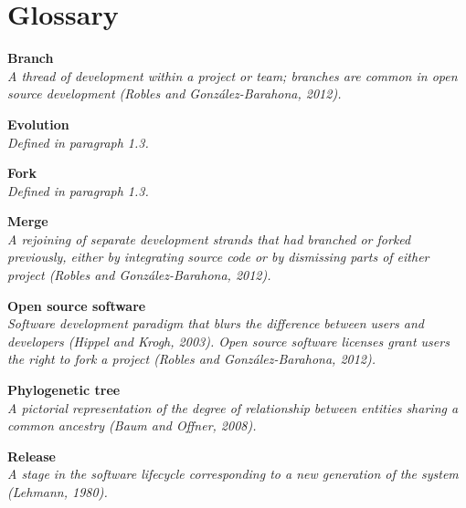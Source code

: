 \chapter{Glossary}
\begin{description}
  
\item{\textbf{Branch}} \hfill \\ \textit{A thread of development within a project or team; branches are common in open source development (Robles and González-Barahona, 2012).}

\item{\textbf{Evolution}} \hfill \\ \textit{Defined in paragraph 1.3.}

\item{\textbf{Fork}} \hfill \\ \textit{Defined in paragraph 1.3.}

\item{\textbf{Merge}} \hfill \\ \textit{A rejoining of separate development strands that had branched or forked previously, either by integrating source code or by dismissing parts of either project (Robles and González-Barahona, 2012).}

\item{\textbf{Open source software}} \hfill \\ \textit{Software development paradigm that blurs the difference between users and developers (Hippel and Krogh, 2003). Open source software licenses grant users the right to fork a project (Robles and González-Barahona, 2012).}

\item{\textbf{Phylogenetic tree}} \hfill \\ \textit{A pictorial representation of the degree of relationship between entities sharing a common ancestry (Baum and Offner, 2008).}

\item{\textbf{Release}} \hfill \\ \textit{A stage in the software lifecycle corresponding to a new generation of the system (Lehmann, 1980).}

\end{description}
